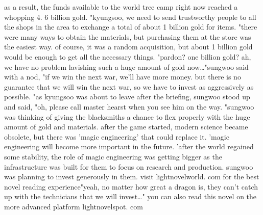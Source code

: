 as a result, the funds available to the world tree camp right now reached a whopping 4.
6 billion gold.
"kyungsoo, we need to send trustworthy people to all the shops in the area to exchange a total of about 1 billion gold for items.
"there were many ways to obtain the materials, but purchasing them at the store was the easiest way.
 of course, it was a random acquisition, but about 1 billion gold would be enough to get all the necessary things.
"pardon? one billion gold? ah, we have no problem lavishing such a huge amount of gold now…"sungwoo said with a nod, "if we win the next war, we'll have more money.
 but there is no guarantee that we will win the next war, so we have to invest as aggressively as possible.
"as kyungsoo was about to leave after the briefing, sungwoo stood up and said, "oh, please call master hearst when you see him on the way.
"sungwoo was thinking of giving the blacksmiths a chance to flex properly with the huge amount of gold and materials.
 after the game started, modern science became obsolete, but there was 'magic engineering' that could replace it.
'magic engineering will become more important in the future.
'after the world regained some stability, the role of magic engineering was getting bigger as the infrastructure was built for them to focus on research and production.
sungwoo was planning to invest generously in them.
visit lightnov‌elworld.
c‌om for the best novel reading experience"yeah, no matter how great a dragon is, they can't catch up with the technicians that we will invest…" you can also read this novel on the more advanced platform lightnovelspot.
com

 